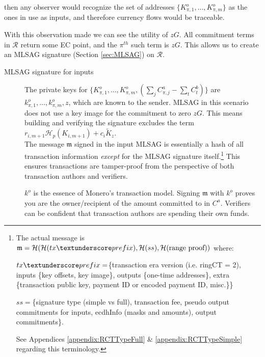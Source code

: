 then any observer would recognize the set of addresses
$\{K_{\pi,1}^o,...,K_{\pi,m}^o\}$
as the ones in use as inputs, and therefore currency flows would be traceable.

With this observation made we can see the utility of $z G$. All commitment terms in $\mathcal{R}$ return some EC point, and the $\pi^{th}$ such term is $z G$. This allows us to create an MLSAG signature (Section \ref{sec:MLSAG}) on $\mathcal{R}$.


\begin{description}%
	
	\item [MLSAG signature for inputs]
	The private keys for 
	\(\{K_{\pi,1}^o,...,K_{\pi,m}^o, (\sum\limits_j C_{\pi, j}^a - \sum\limits_t C^b_{t})\}\)
	are\\
	\( k_{\pi,1}^o,...,k_{\pi,m}^o, z \), which are known to the sender. 
	MLSAG in this scenario does not use a key image for the commitment to zero $z G$. This means building and verifying the signature excludes the term $r_{i,m+1} \mathcal{H}_p(K_{i,m+1}) + c_i \tilde{K}_z$.\\
	
	The message $\mathfrak{m}$ signed in the input MLSAG is essentially a hash of all transaction information {\em except} for the MLSAG signature itself.\footnote{\label{MLSAG_message}The actual message is $\mathfrak{m} = \mathcal{H}(\mathcal{H}(tx\textunderscore prefix),\mathcal{H}(ss),\mathcal{H}(\text{range proof}))$ where:\par
	$tx\textunderscore prefix = $\{transaction era version (i.e. ringCT = 2), inputs \{key offsets, key image\}, outputs \{one-time addresses\}, extra \{transaction public key, payment ID or encoded payment ID, misc.\}\}\par
	$ss = $\{signature type (simple vs full), transaction fee, pseudo output commitments for inputs, ecdhInfo (masks and amounts), output commitments\}.\par
	See Appendices \ref{appendix:RCTTypeFull} \& \ref{appendix:RCTTypeSimple} regarding this terminology.} This ensures transactions are tamper-proof from the perspective of both transaction authors and verifiers.
	
	$k^o$ is the essence of Monero's transaction model. Signing $\mathfrak{m}$ with $k^o$ proves you are the owner/recipient of the amount committed to in $C^a$. Verifiers can be confident that transaction authors are spending their own funds.
	

\end{description}
